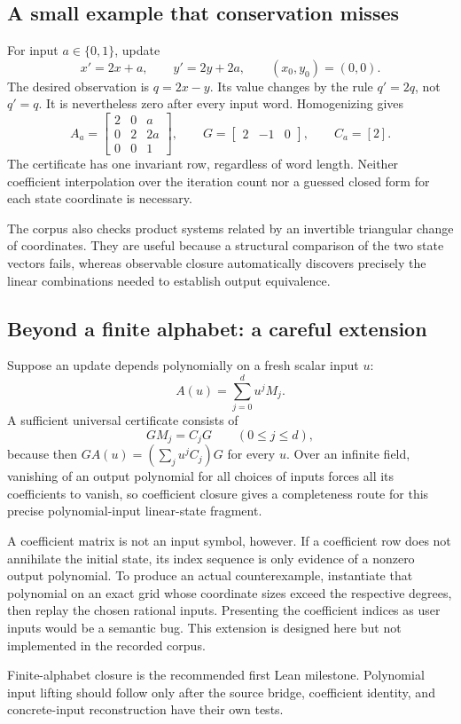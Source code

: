 \subsection{A small example that conservation misses}

For input $a\in\{0,1\}$, update
\[
 x'=2x+a,\qquad y'=2y+2a,
 \qquad (x_0,y_0)=(0,0).
\]
The desired observation is $q=2x-y$. Its value changes by the rule $q'=2q$,
not $q'=q$. It is nevertheless zero after every input word. Homogenizing gives
\[
 A_a=\begin{bmatrix}2&0&a\\0&2&2a\\0&0&1\end{bmatrix},\qquad
 G=\begin{bmatrix}2&-1&0\end{bmatrix},\qquad C_a=[2].
\]
The certificate has one invariant row, regardless of word length. Neither
coefficient interpolation over the iteration count nor a guessed closed form
for each state coordinate is necessary.

The corpus also checks product systems related by an invertible triangular
change of coordinates. They are useful because a structural comparison of the
two state vectors fails, whereas observable closure automatically discovers
precisely the linear combinations needed to establish output equivalence.

\subsection{Beyond a finite alphabet: a careful extension}
\label{sec:symbolic-input}

Suppose an update depends polynomially on a fresh scalar input $u$:
\[
 A(u)=\sum_{j=0}^d u^j M_j.
\]
A sufficient universal certificate consists of
\[
 GM_j=C_jG\qquad(0\le j\le d),
\]
because then $GA(u)=(\sum_j u^jC_j)G$ for every $u$. Over an infinite field,
vanishing of an output polynomial for all choices of inputs forces all its
coefficients to vanish, so coefficient closure gives a completeness route for
this precise polynomial-input linear-state fragment.

A coefficient matrix is not an input symbol, however. If a coefficient row does
not annihilate the initial state, its index sequence is only evidence of a
nonzero output polynomial. To produce an actual counterexample, instantiate
that polynomial on an exact grid whose coordinate sizes exceed the respective
degrees, then replay the chosen rational inputs. Presenting the coefficient
indices as user inputs would be a semantic bug. This extension is designed here
but not implemented in the recorded corpus.

Finite-alphabet closure is the recommended first Lean milestone. Polynomial
input lifting should follow only after the source bridge, coefficient identity,
and concrete-input reconstruction have their own tests.
